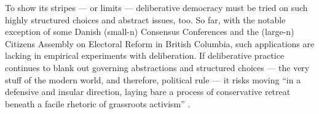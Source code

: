 To show its stripes --- or limits --- deliberative democracy must be tried on such highly structured choices and abstract issues, too.
So far, with the notable exception of some Danish (small-n) Consensus Conferences and the (large-n) Citizens Assembly on Electoral Reform in British Columbia, such applications are lacking in empirical experiments with deliberation.
If deliberative practice continues to blank out governing abstractions and structured choices --- the very stuff of the modern world, and therefore, political rule --- it risks moving ``in a defensive and insular direction, laying bare a process of conservative retreat beneath a facile rhetoric of grassroots activism'' \citep[759]{Boggs-1997-aa}.


